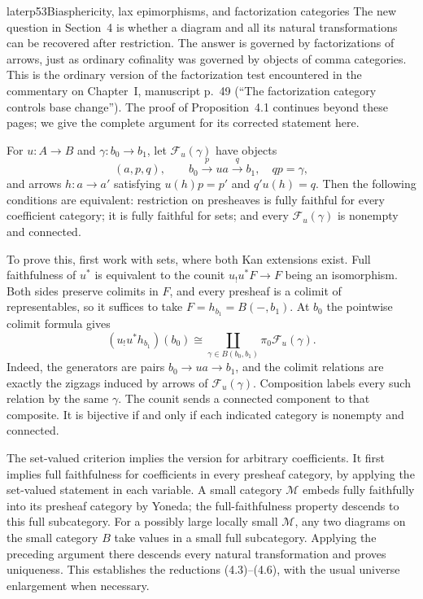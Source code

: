 \begin{dcomment}{later}{p53}{Biasphericity, lax epimorphisms, and factorization categories}
The new question in Section~4 is whether a diagram and all its natural transformations can be recovered after restriction. The answer is governed by factorizations of arrows, just as ordinary cofinality was governed by objects of comma categories. This is the ordinary version of the factorization test encountered in the commentary on Chapter~I, manuscript p.~49 (``The factorization category controls base change''). The proof of Proposition~4.1 continues beyond these pages; we give the complete argument for its corrected statement here.

For $u:A\longrightarrow B$ and $\gamma:b_0\longrightarrow b_1$, let $\mathcal F_u(\gamma)$ have objects
\[
 (a,p,q),\qquad b_0\xrightarrow{p}u a\xrightarrow{q}b_1,
 \quad qp=\gamma,
\]
and arrows $h:a\longrightarrow a'$ satisfying $u(h)p=p'$ and $q'u(h)=q$. Then the following conditions are equivalent: restriction on presheaves is fully faithful for every coefficient category; it is fully faithful for sets; and every $\mathcal F_u(\gamma)$ is nonempty and connected.

To prove this, first work with sets, where both Kan extensions exist. Full faithfulness of $u^*$ is equivalent to the counit $u_!u^*F\longrightarrow F$ being an isomorphism. Both sides preserve colimits in $F$, and every presheaf is a colimit of representables, so it suffices to take $F=h_{b_1}=B(-,b_1)$. At $b_0$ the pointwise colimit formula gives
\[
 (u_!u^*h_{b_1})(b_0)
 \cong\coprod_{\gamma\in B(b_0,b_1)}
             \pi_0\mathcal F_u(\gamma).
\]
Indeed, the generators are pairs $b_0\longrightarrow u a\longrightarrow b_1$, and the colimit relations are exactly the zigzags induced by arrows of $\mathcal F_u(\gamma)$. Composition labels every such relation by the same $\gamma$. The counit sends a connected component to that composite. It is bijective if and only if each indicated category is nonempty and connected.

The set-valued criterion implies the version for arbitrary coefficients. It first implies full faithfulness for coefficients in every presheaf category, by applying the set-valued statement in each variable. A small category $\mathcal M$ embeds fully faithfully into its presheaf category by Yoneda; the full-faithfulness property descends to this full subcategory. For a possibly large locally small $\mathcal M$, any two diagrams on the small category $B$ take values in a small full subcategory. Applying the preceding argument there descends every natural transformation and proves uniqueness. This establishes the reductions (4.3)--(4.6), with the usual universe enlargement when necessary.


\end{dcomment}
